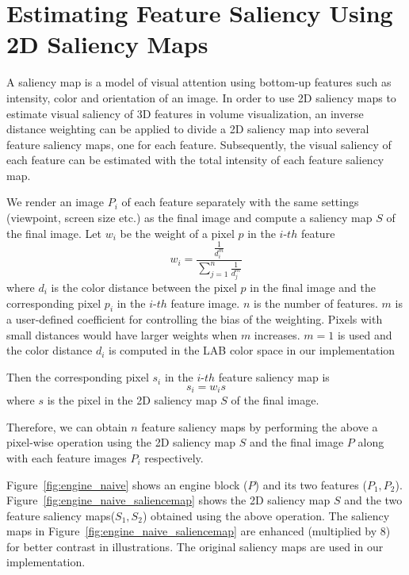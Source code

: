 \chapter{Estimating Feature Saliency Using 2D Saliency Maps \label{2d_saliency_map}}

A saliency map is a model of visual attention using bottom-up features such as intensity, color and orientation of an image.
In order to use 2D saliency maps \cite{itti_model_1998} to estimate visual saliency of 3D features in volume visualization, an inverse distance weighting \cite{shepard_two-dimensional_1968} can be applied to divide a 2D saliency map into several feature saliency maps, one for each feature. Subsequently, the visual saliency of each feature can be estimated with the total intensity of each feature saliency map.

We render an image $ P_{i} $ of each feature separately with the same settings (viewpoint, screen size etc.) as the final image and compute a saliency map $ S $ of the final image.
Let $ w_{i} $ be the weight of a pixel $ p $ in the $i$-$th$ feature
\[ w_{i} = \frac{ \frac{1}{d_{i}^{m}} }{ \sum_{j=1}^{n} \frac{1}{d_{j}^{m}} } \]
where $ d_{i} $ is the color distance between the pixel $ p $ in the final image and the corresponding pixel $ p_{i} $ in the $i$-$th$ feature image.
$ n $ is the number of features.
$ m $ is a user-defined coefficient for controlling the bias of the weighting. Pixels with small distances would have larger weights when $ m $ increases. $ m=1 $ is used and the color distance $ d_{i} $ is computed in the LAB color space in our implementation

Then the corresponding pixel $ s_{i} $ in the $i$-$th$  feature saliency map is
\[ s_{i}=w_{i}s \]
where $ s $ is the pixel in the 2D saliency map $ S $ of the final image.

Therefore, we can obtain $ n $ feature saliency maps by performing the above a pixel-wise operation using the 2D saliency map $ S $ and the final image $ P $ along with each feature images $ P_{i} $ respectively.

Figure~\ref{fig:engine_naive} shows an engine block ($ P $) and its two features ($ P_{1} , P_{2} $).
Figure~\ref{fig:engine_naive_saliencemap} shows the 2D saliency map $ S $ and the two feature saliency maps($ S_{1} , S_{2} $) obtained using the above operation.
The saliency maps in Figure~\ref{fig:engine_naive_saliencemap} are enhanced (multiplied by 8) for better contrast in illustrations. The original saliency maps are used in our implementation.

